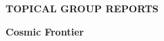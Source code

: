

  \vfill

\begin{center}
\begin{Huge}   {\bf  TOPICAL GROUP REPORTS}

\bigskip

\bigskip

 {\bf Cosmic Frontier }

\vfill

\vfill

\end{Huge}
\end{center}

\newpage
\thispagestyle{empty}
\mbox{\null}


